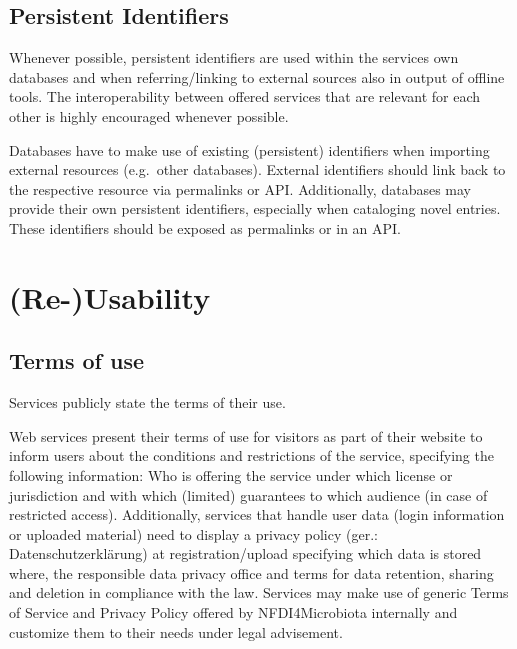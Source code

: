 \documentclass[
  paper=a4,
  ,captions=tableheading
]{scrartcl}
\renewenvironment{quote}{\begin{shaded*}\begin{em}}{\end{em}\end{shaded*}}
\renewenvironment{quote}{\begin{customblockquote}\list{}{\rightmargin=0em\leftmargin=0em}%
\item\relax\color{blockquote-text}\ignorespaces}{\unskip\unskip\endlist\end{customblockquote}}
\begin{document}
\hypertarget{persistent-identifiers}{%
\subsection{Persistent Identifiers}\label{persistent-identifiers}}

Whenever possible, persistent identifiers are used within the services
own databases and when referring/linking to external sources also in
output of offline tools. The interoperability between offered services
that are relevant for each other is highly encouraged whenever possible.

\begin{quote}
Databases have to make use of existing (persistent) identifiers when
importing external resources (e.g.~other databases). External
identifiers should link back to the respective resource via permalinks
or API. Additionally, databases may provide their own persistent
identifiers, especially when cataloging novel entries. These identifiers
should be exposed as permalinks or in an API.
\end{quote}

\hypertarget{re-usability}{%
\section{(Re-)Usability}\label{re-usability}}

\hypertarget{terms-of-use}{%
\subsection{Terms of use}\label{terms-of-use}}

Services publicly state the terms of their use.

\begin{quote}
Web services present their terms of use for visitors as part of their
website to inform users about the conditions and restrictions of the
service, specifying the following information: Who is offering the
service under which license or jurisdiction and with which (limited)
guarantees to which audience (in case of restricted access).
Additionally, services that handle user data (login information or
uploaded material) need to display a privacy policy (ger.:
Datenschutzerklärung) at registration/upload specifying which data is
stored where, the responsible data privacy office and terms for data
retention, sharing and deletion in compliance with the law. Services may
make use of generic Terms of Service and Privacy Policy offered by
NFDI4Microbiota internally and customize them to their needs under legal
advisement.
\end{quote}
\end{document}
